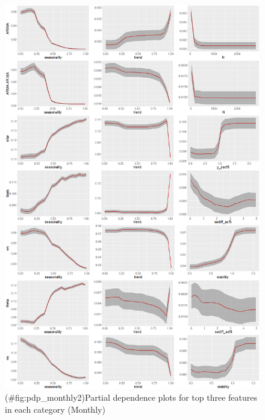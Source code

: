 \documentclass[11pt,a4paper,]{article}
\theoremstyle{definition}
\theoremstyle{definition}
\theoremstyle{definition}
\theoremstyle{remark}
\begin{document}
\newpage

\begin{figure}
\centering
\includegraphics{figures/pdp_monthly2-1.png}
\caption{(\#fig:pdp\_monthly2)Partial dependence plots for top three
features in each category (Monthly)}
\end{figure}

\newpage
\end{document}
